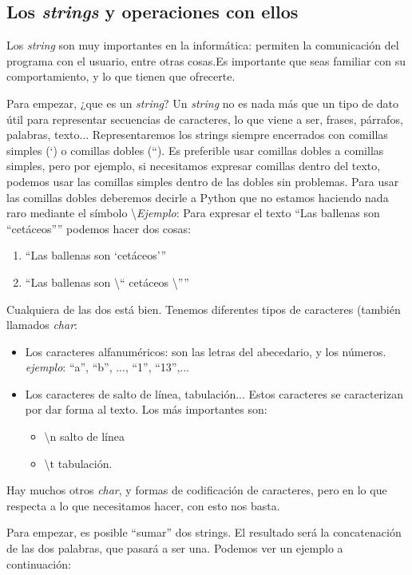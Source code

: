 \documentclass{article}
\begin{document}
\subsection{Los \textit{strings} y operaciones con ellos}
Los \textit{string} son muy importantes en la informática: permiten la comunicación del programa con el usuario, entre otras cosas.Es importante que seas familiar con su comportamiento, y lo que tienen que ofrecerte. 

Para empezar, ¿que es un \textit{string}? Un \textit{string} no es nada más que un tipo de dato útil para representar secuencias de caracteres, lo que viene a ser, frases, párrafos, palabras, texto... Representaremos los strings siempre encerrados con comillas simples (\lq) o comillas dobles (``). Es preferible usar comillas dobles a comillas simples, pero por ejemplo, si necesitamos expresar comillas dentro del texto, podemos usar las comillas simples dentro de las dobles sin problemas. Para usar las comillas dobles deberemos decirle a Python que no estamos haciendo nada raro mediante el símbolo \textbackslash \textit{Ejemplo}:
Para expresar el texto ``Las ballenas son ``cetáceos'''' podemos hacer dos cosas:
\begin{enumerate}
    \item ``Las ballenas son \lq cetáceos\rq ''
    \item ``Las ballenas son \textbackslash `` cetáceos \textbackslash ''''
\end{enumerate}
Cualquiera de las dos está bien.
Tenemos diferentes tipos de caracteres (también llamados \textit{char}:
\begin{itemize}
    \item Los caracteres alfanuméricos: son las letras del abecedario, y los números.
    \textit{ejemplo}: ``a'', ``b'', ..., ``1'', ``13'',...
    \item Los caracteres de salto de línea, tabulación... Estos caracteres se caracterizan por dar forma al texto. Los más importantes son:
    \begin{itemize}
        \item \textbackslash n salto de línea
        \item \textbackslash t tabulación.
    \end{itemize}
\end{itemize}
Hay muchos otros \textit{char}, y formas de codificación de caracteres, pero en lo que respecta a lo que necesitamos hacer, con esto nos basta.

Para empezar, es posible ``sumar'' dos strings. El resultado será la concatenación de las dos palabras, que pasará a ser una. Podemos ver un ejemplo a continuación:
\end{document}

